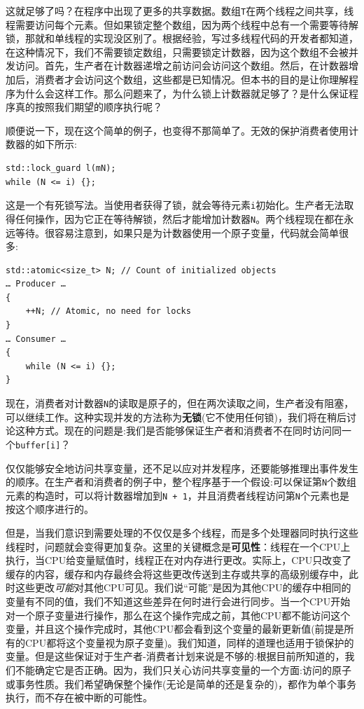 这就足够了吗？在程序中出现了更多的共享数据。数组\texttt{T}在两个线程之间共享，线程需要访问每个元素。但如果锁定整个数组，因为两个线程中总有一个需要等待解锁，那就和单线程的实现没区别了。根据经验，写过多线程代码的开发者都知道，在这种情况下，我们不需要锁定数组，只需要锁定计数器，因为这个数组不会被并发访问。首先，生产者在计数器递增之前访问会访问这个数组。然后，在计数器增加后，消费者才会访问这个数组，这些都是已知情况。但本书的目的是让你理解程序为什么会这样工作。那么问题来了，为什么锁上计数器就足够了？是什么保证程序真的按照我们期望的顺序执行呢？

顺便说一下，现在这个简单的例子，也变得不那简单了。无效的保护消费者使用计数器的如下所示:

\begin{lstlisting}[style=styleCXX]
std::lock_guard l(mN);
while (N <= i) {};
\end{lstlisting}

这是一个有死锁写法。当使用者获得了锁，就会等待元素\texttt{i}初始化。生产者无法取得任何操作，因为它正在等待解锁，然后才能增加计数器\texttt{N}。两个线程现在都在永远等待。很容易注意到，如果只是为计数器使用一个原子变量，代码就会简单很多:

\begin{lstlisting}[style=styleCXX]
std::atomic<size_t> N; // Count of initialized objects
… Producer …
{
	++N; // Atomic, no need for locks
}
… Consumer …
{
	while (N <= i) {};
}
\end{lstlisting}

现在，消费者对计数器\texttt{N}的读取是原子的，但在两次读取之间，生产者没有阻塞，可以继续工作。这种实现并发的方法称为\textbf{无锁}(它不使用任何锁)，我们将在稍后讨论这种方式。现在的问题是:我们是否能够保证生产者和消费者不在同时访问同一个\texttt{buffer[i]}？


仅仅能够安全地访问共享变量，还不足以应对并发程序，还要能够推理出事件发生的顺序。在生产者和消费者的例子中，整个程序基于一个假设:可以保证第\texttt{N}个数组元素的构造时，可以将计数器增加到\texttt{N + 1}，并且消费者线程访问第\texttt{N}个元素也是按这个顺序进行的。

但是，当我们意识到需要处理的不仅仅是多个线程，而是多个处理器同时执行这些线程时，问题就会变得更加复杂。这里的关键概念是\textbf{可见性}：线程在一个CPU上执行，当CPU给变量赋值时，线程正在对内存进行更改。实际上，CPU只改变了缓存的内容，缓存和内存最终会将这些更改传送到主存或共享的高级别缓存中，此时这些更改\textit{可能}对其他CPU可见。我们说“可能”是因为其他CPU的缓存中相同的变量有不同的值，我们不知道这些差异在何时进行会进行同步。当一个CPU开始对一个原子变量进行操作，那么在这个操作完成之前，其他CPU都不能访问这个变量，并且这个操作完成时，其他CPU都会看到这个变量的最新更新值(前提是所有的CPU都将这个变量视为原子变量)。我们知道，同样的道理也适用于锁保护的变量。但是这些保证对于生产者-消费者计划来说是不够的:根据目前所知道的，我们不能确定它是否正确。因为，我们只关心访问共享变量的一个方面:访问的原子或事务性质。我们希望确保整个操作(无论是简单的还是复杂的)，都作为单个事务执行，而不存在被中断的可能性。

